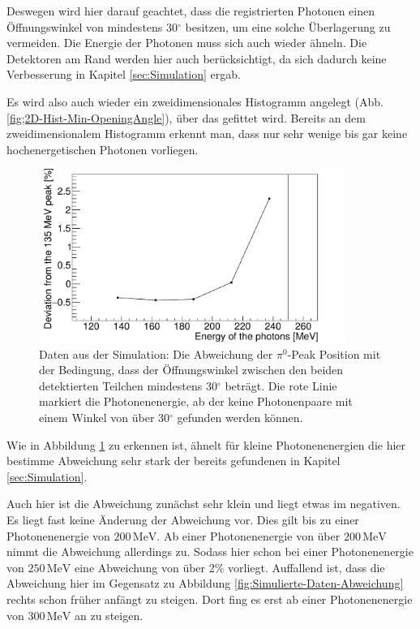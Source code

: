 \documentclass[a4paper,11pt,oneside,final,german,openbib,pdftex]{scrbook}
\begin{document}
{Deswegen wird hier darauf geachtet, dass die registrierten Photonen einen \"Offnungswinkel von mindestens 30$^{\circ}$ besitzen, um eine solche \"Uberlagerung zu vermeiden.
Die Energie der Photonen muss sich auch wieder \"ahneln.
Die Detektoren am Rand werden hier auch ber\"ucksichtigt, da sich dadurch keine Verbesserung in Kapitel \ref{sec:Simulation} ergab.

Es wird also auch wieder ein zweidimensionales Histogramm angelegt (Abb. \ref{fig;2D-Hist-Min-OpeningAngle}), \"uber das gefittet wird. Bereits an dem zweidimensionalem Histogramm erkennt man, dass nur sehr wenige bis gar keine hochenergetischen Photonen vorliegen.

\begin{figure}[h!]
	\begin{center}
		\includegraphics[width=100mm]{20170505MinAngle30Deviation}
		\caption[Simulation: Abweichung für Mindestwinkel zwischen detektierten Photonen]{Daten aus der Simulation: Die Abweichung der $\pi^0$-Peak Position mit der Bedingung, dass der \"Offnungswinkel zwischen den beiden detektierten Teilchen mindestens 30$^{\circ}$ betr\"agt. Die rote Linie markiert die Photonenenergie, ab der keine Photonenpaare mit einem Winkel von \"uber 30$^{\circ}$ gefunden werden k\"onnen.}
		\label{fig:Relative-Abweichung-Min-Opening-Angle}
	\end{center}
\end{figure}

Wie in Abbildung \ref{fig:Relative-Abweichung-Min-Opening-Angle} zu erkennen ist, \"ahnelt f\"ur kleine Photonenenergien die hier bestimme Abweichung sehr stark der bereits gefundenen in Kapitel \ref{sec:Simulation}.

Auch hier ist die Abweichung zun\"achst sehr klein und liegt etwas im negativen. Es liegt fast keine \"Anderung der Abweichung vor. Dies gilt bis zu einer Photonenenergie von $200\,\text{MeV}$.
Ab einer Photonenenergie von \"uber $200\,\text{MeV}$ nimmt die Abweichung allerdings zu. Sodass hier schon bei einer Photonenenergie von $250\,\text{MeV}$ eine Abweichung von \"uber 2\% vorliegt. 
Auffallend ist, dass die Abweichung hier im Gegensatz zu Abbildung \ref{fig:Simulierte-Daten-Abweichung} rechts schon fr\"uher anf\"angt zu steigen. Dort fing es erst ab einer Photonenenergie von $300\,\text{MeV}$ an zu steigen.

}
\end{document}
